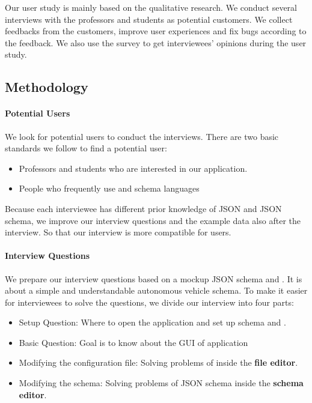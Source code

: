 Our user study is mainly based on the qualitative research.
We conduct several interviews with the professors and students as potential customers.
We collect feedbacks from the customers, improve user experiences and fix bugs according to the feedback.
We also use the survey to get interviewees' opinions during the user study.

\subsection{Methodology}\label{subsec:methodology}

\paragraph{Potential Users}
We look for potential users to conduct the interviews.
There are two basic standards we follow to find a potential user:
\begin{itemize}
    \item Professors and students who are interested in our application.
    \item People who frequently use \cfgfiles and schema languages
\end{itemize}
Because each interviewee has different prior knowledge of JSON and JSON schema, we improve our interview questions and the example data also after the interview.
So that our interview is more compatible for users.

\paragraph{Interview Questions}
We prepare our interview questions based on a mockup JSON schema and \cfgfiles.
It is about a simple and understandable autonomous vehicle schema.
To make it easier for interviewees to solve the questions, we divide our interview into four parts:
\begin{itemize}
    \item Setup Question: Where to open the application and set up schema and \cfgfiles.
    \item Basic Question: Goal is to know about the GUI of application
    \item Modifying the configuration file: Solving problems of \cfgfiles inside the \textbf{file editor}.
    \item Modifying the schema: Solving problems of JSON schema inside the \textbf{schema editor}.
\end{itemize}

